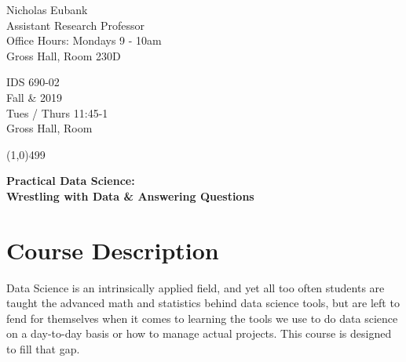 \documentclass[12pt]{article}
\begin{document}
\singlespacing






\thispagestyle{empty}
\begin{minipage}[t]{.5\textwidth}
	Nicholas Eubank \\
	 Assistant Research Professor\\
	 Office Hours: Mondays 9 - 10am\\
	 Gross Hall, Room 230D
     \vspace*{0.1cm}
\end{minipage}
\begin{minipage}[t]{.5\textwidth}
	\begin{flushright}  IDS 690-02\\
	Fall \& 2019\\
	Tues / Thurs 11:45-1 \\
	Gross Hall, Room
    \vspace*{0.1cm}
\end{flushright}
\end{minipage}


\line(1,0){499}

\vspace{.35in}

\begin{center}
	\textbf{\LARGE{Practical Data Science:} }\\
	\vspace*{.05in}
	\textbf{\large{Wrestling with Data \& Answering Questions}}
\end{center}








\section{Course Description}

Data Science is an intrinsically applied field, and yet all too often students are taught the advanced math and statistics behind data science tools, but are left to fend for themselves when it comes to learning the tools we use to do data science on a day-to-day basis or how to manage actual projects. This course is designed to fill that gap.
\end{document}
